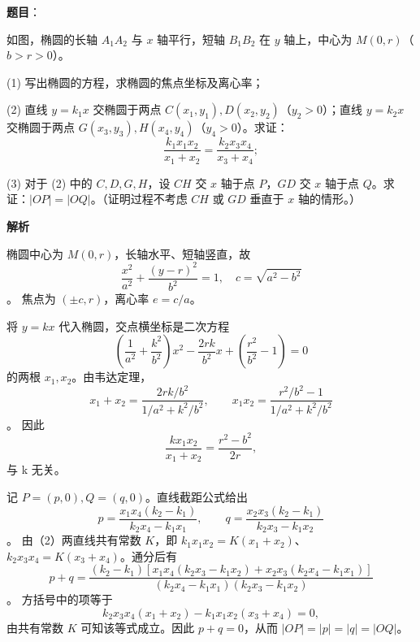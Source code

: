 \begin{answer}

\textbf{题目}：

如图，椭圆的长轴 \(A_1A_2\) 与 \(x\) 轴平行，短轴 \(B_1B_2\) 在 \(y\) 轴上，中心为 \(M(0,r)\)（\(b>r>0\)）。

    (1) 写出椭圆的方程，求椭圆的焦点坐标及离心率；

    (2) 直线 \(y=k_1x\) 交椭圆于两点 \(C(x_1,y_1),D(x_2,y_2)\)（\(y_2>0\)）；直线 \(y=k_2x\) 交椭圆于两点 \(G(x_3,y_3),H(x_4,y_4)\)（\(y_4>0\)）。求证：
\nopagebreak[4]
\[
    \frac{k_1x_1x_2}{x_1+x_2}=\frac{k_2x_3x_4}{x_3+x_4};
\]

    (3) 对于 (2) 中的 \(C,D,G,H\)，设 \(CH\) 交 \(x\) 轴于点 \(P\)，\(GD\) 交 \(x\) 轴于点 \(Q\)。求证：\(|OP|=|OQ|\)。（证明过程不考虑 \(CH\) 或 \(GD\) 垂直于 \(x\) 轴的情形。）
\nopagebreak[4]
\begin{center}\end{center}
\nopagebreak[4]
\textbf{解析}


椭圆中心为 \(M(0,r)\)，长轴水平、短轴竖直，故
\nopagebreak[4]
\[
\frac{x^2}{a^2}+\frac{(y-r)^2}{b^2}=1,\quad c=\sqrt{a^2-b^2}
\]
。
焦点为 \((\pm c,r)\)，离心率 \(e=c/a\)。


将 \(y=kx\) 代入椭圆，交点横坐标是二次方程
\nopagebreak[4]
\[
\left(\frac1{a^2}+\frac{k^2}{b^2}\right)x^2-\frac{2rk}{b^2}x+\left(\frac{r^2}{b^2}-1\right)=0
\]
的两根 \(x_1,x_2\)。由韦达定理，
\nopagebreak[4]
\[
x_1+x_2=\frac{2rk/b^2}{1/a^2+k^2/b^2},\qquad x_1x_2=\frac{r^2/b^2-1}{1/a^2+k^2/b^2}
\]
。
因此
\nopagebreak[4]
\[
\frac{kx_1x_2}{x_1+x_2}=\frac{r^2-b^2}{2r},
\]
与 k 无关。


记 \(P=(p,0),Q=(q,0)\)。直线截距公式给出
\nopagebreak[4]
\[
p=\frac{x_1x_4(k_2-k_1)}{k_2x_4-k_1x_1},\qquad q=\frac{x_2x_3(k_2-k_1)}{k_2x_3-k_1x_2}
\]
。
由（2）两直线共有常数 \(K\)，即 \(k_1x_1x_2=K(x_1+x_2)\)、\(k_2x_3x_4=K(x_3+x_4)\)。通分后有
\nopagebreak[4]
\[
p+q=\frac{(k_2-k_1)\left[x_1x_4(k_2x_3-k_1x_2)+x_2x_3(k_2x_4-k_1x_1)\right]}{(k_2x_4-k_1x_1)(k_2x_3-k_1x_2)}
\]
。
方括号中的项等于
\nopagebreak[4]
\[
k_2x_3x_4(x_1+x_2)-k_1x_1x_2(x_3+x_4)=0,
\]
由共有常数 \(K\) 可知该等式成立。因此 \(p+q=0\)，从而 \(|OP|=|p|=|q|=|OQ|\)。




\end{answer}

